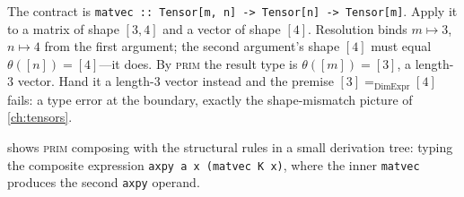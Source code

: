 \begin{example}
\label{ex:b-matvec}
The contract is \lstinline[style=l4style]|matvec :: Tensor[m, n] -> Tensor[n] -> Tensor[m]|.
Apply it to a matrix of shape $[3,4]$ and a vector of shape $[4]$. Resolution
binds $m \mapsto 3$, $n \mapsto 4$ from the first argument; the second argument's
shape $[4]$ must equal $\theta([n]) = [4]$---it does. By \textsc{prim} the result
type is $\theta([m]) = [3]$, a length-$3$ vector. Hand it a length-$3$ vector
instead and the premise $[3] =_{\text{DimExpr}} [4]$ fails: a type error at the
boundary, exactly the shape-mismatch picture of \cref{ch:tensors}.
\end{example}

 shows \textsc{prim} composing with the structural rules in a
small derivation tree: typing the composite expression
\lstinline[style=l4style]|axpy a x (matvec K x)|, where the inner
\lstinline[style=l4style]|matvec| produces the second \lstinline[style=l4style]|axpy|
operand.

